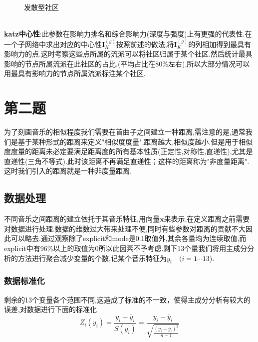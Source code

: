 \documentclass[a4paper,12pt]{article}
\begin{document}
\begin{spacing}{1.2}
\begin{figure}[!ht]
\begin{center}
\begin{minipage}{0.45\linewidth}
		 			\caption{发散型社区}
		 		\end{minipage}
		 	\end{center}
		 \end{figure}\\
	 \textbf{katz中心性}:此参数在影响力排名和综合影响力(深度与强度)上有更强的代表性.在一个子网络中求出对应的中心性$\bm{I}^{(g)}_{K}$按照前述的做法,将$\bm{I}^{(g)}_{K}$的列相加得到最具有影响力的点.这时考察这些点所属的流派可以将社区归属于某个社区.然后统计最具影响的节点所属流派在此社区的占比.(平均占比在80\%左右),所以大部分情况可以用最具有影响力的节点所属流派标注某个社区.
	\section{第二题} 
	为了刻画音乐的相似程度我们需要在首曲子之间建立一种距离,需注意的是,通常我们是基于某种形式的距离来定义"相似度度量",距离越大,相似度越小.但是用于相似度度量的距离未必定要满足距离度的所有基本性质(正定性,对称性,直递性),尤其是直递性(三角不等式).此时该距离不再满足直递性；这样的距离称为"非度量距离".这时我们引入的距离就是一种非度量距离.
	\subsection{数据处理}
	\par 不同音乐之间距离的建立依托于其音乐特征,用向量$\bm{x}$来表示,在定义距离之前需要对数据进行处理.数据的维数过大带来处理不便,同时有些参数对距离的贡献不大因此可以略去.通过观察除了explicit和mode是0.1取值外,其余各量均为连续取值,而explicit中有96\%以上的取值为0所以此因素不予考虑.剩下13个量我们将用主成分分析的方法进行聚合减少变量的个数,记某个音乐特征为$y_{i}\quad (i=1\cdots13$).
	\subsubsection{数据标准化}
	剩余的13个变量各个范围不同,这造成了标准的不一致，使得主成分分析有较大的误差,对数据进行下面的标准化
	$$
		Z_{i}(y_{i})=\frac{y_{i}-\overline{y}_{i}}{S(y_{i})}=\frac{y_{i}-\overline{y}_{i}}{\sqrt{\frac{(y_{i}-\overline{y}_{i})^{2}}{{n-1}}}}
	$$

\end{spacing}
\end{document}
